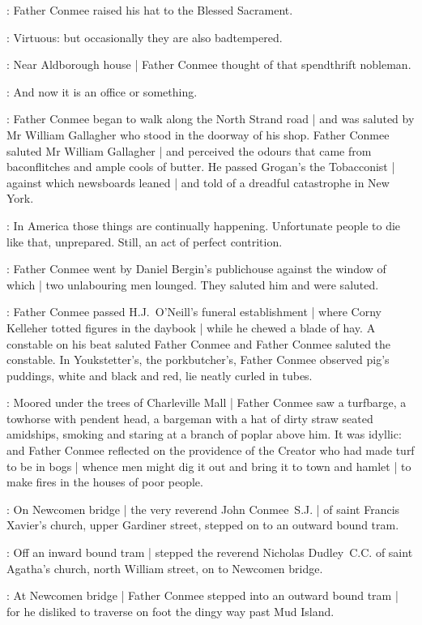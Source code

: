 :
Father Conmee raised his hat to the Blessed Sacrament.

\conmeeint:
Virtuous: but occasionally they are also badtempered.

:
Near Aldborough house |
Father Conmee thought of that spendthrift nobleman.

\conmeeint:
And now it is an office or something.

:
Father Conmee began to walk along the North Strand road |
and was saluted by Mr William Gallagher
who stood in the doorway of his shop.
Father Conmee saluted Mr William Gallagher |
and perceived the odours
that came from baconflitches and ample cools of butter.
He passed Grogan's the Tobacconist |
against which newsboards leaned |
and told of a dreadful catastrophe
in New York.

\conmeeint:
In America those things are continually happening.
Unfortunate people to die like that, unprepared.
Still, an act of perfect contrition.

:
Father Conmee went by Daniel Bergin's publichouse
against the window of which |
two unlabouring men lounged.
They saluted him and were saluted.

:
Father Conmee passed H.J.~O'Neill's funeral establishment |
where Corny Kelleher totted figures in the daybook |
while he chewed a blade of hay.
A constable on his beat saluted Father Conmee
and Father Conmee saluted the constable.
In Youkstetter's, the porkbutcher's,
Father Conmee observed pig's puddings,
white and black and red,
lie neatly curled in tubes.

:
Moored under the trees of Charleville Mall |
Father Conmee saw a turfbarge,
a towhorse with pendent head,
a bargeman with a hat of dirty straw seated amidships,
smoking and staring at a branch of poplar above him.
It was idyllic:
and Father Conmee reflected on the providence of the Creator
who had made turf to be in bogs |
whence men might dig it out and bring it to town and hamlet |
to make fires in the houses of poor people.

:
On Newcomen bridge |
the very reverend John Conmee~S.J. |
of saint Francis Xavier's church, upper Gardiner street,
stepped on to an outward bound tram.

:
Off an inward bound tram |
stepped the reverend Nicholas Dudley~C.C.
of saint Agatha's church, north William street,
on to Newcomen bridge.

:
At Newcomen bridge |
Father Conmee stepped into an outward bound tram |
for he disliked to traverse on foot the dingy way past Mud Island.

